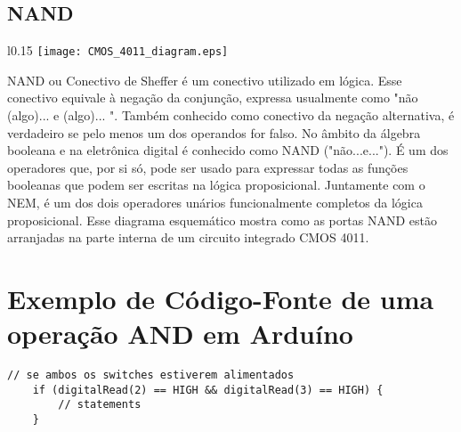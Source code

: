 \subsection{NAND}
\begin{wrapfigure}{l}{0.15\textwidth}
    \centering
    \texttt{[image: CMOS\_4011\_diagram.eps]}
\end{wrapfigure}

NAND ou Conectivo de Sheffer é um conectivo utilizado em lógica. Esse conectivo equivale à negação da conjunção, expressa usualmente como "não (algo)... e (algo)... ". Também conhecido como conectivo da negação alternativa, é verdadeiro se pelo menos um dos operandos for falso. No âmbito da álgebra booleana e na eletrônica digital é conhecido como NAND ("não...e..."). É um dos operadores que, por si só, pode ser usado para expressar todas as funções booleanas que podem ser escritas na lógica proposicional. Juntamente com o NEM, é um dos dois operadores unários funcionalmente completos da lógica proposicional. Esse diagrama esquemático mostra como as portas NAND estão arranjadas na parte interna de um circuito integrado CMOS 4011.

\newpage
\section{Exemplo de Código-Fonte de uma operação AND em Arduíno}

\begin{lstlisting}[frame=trbl]
    // se ambos os switches estiverem alimentados
    if (digitalRead(2) == HIGH && digitalRead(3) == HIGH) {
        // statements
    }
\end{lstlisting}
